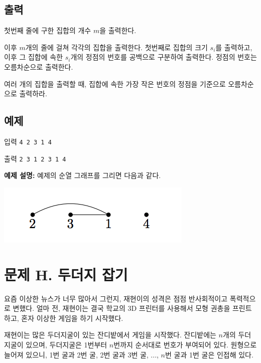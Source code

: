 \documentclass{article}
\begin{document}
\subsection{출력}
첫번째 줄에 구한 집합의 개수 $m$을 출력한다. \newline

이후 $m$개의 줄에 걸쳐 각각의 집합을 출력한다. 첫번째로 집합의 크기 $s_i$를 출력하고, 이후 그 집합에 속한 $s_i$개의 정점의 번호를 공백으로 구분하여 출력한다. 정점의 번호는 오름차순으로 출력한다. \newline

여러 개의 집합을 출력할 때, 집합에 속한 가장 작은 번호의 정점을 기준으로 오름차순으로 출력하라.

\subsection{예제}
입력
\bgroup\obeylines
\texttt{4
	2 3 1 4	\newline}
\egroup

출력
\bgroup\obeylines
\texttt{2
	3 1 2 3
	1 4	\newline}
\egroup

\textbf{예제 설명:} 예제의 순열 그래프를 그리면 다음과 같다.

\includegraphics[scale=0.75]{fig2.png}

\newpage


\section{문제 H.  두더지 잡기}
요즘 이상한 뉴스가 너무 많아서 그런지, 재현이의 성격은 점점 반사회적이고 폭력적으로 변했다. 얼마 전, 재현이는 결국 학교의 3D 프린터를 사용해서 모형 권총을 프린트하고, 혼자 이상한 게임을 하기 시작했다. \newline

재현이는 많은 두더지굴이 있는 잔디밭에서 게임을 시작했다. 잔디밭에는 $n$개의 두더지굴이 있으며, 두더지굴은 1번부터 $n$번까지 순서대로 번호가 부여되어 있다. 원형으로 늘어져 있으니, 1번 굴과 2번 굴, 2번 굴과 3번 굴, ..., $n$번 굴과 1번 굴은 인접해 있다. \newline
\end{document}

